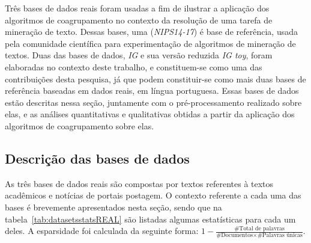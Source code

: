 \documentclass[
    12pt,                %
    oneside,            %
    a4paper,            %
    english,            %
    brazil                %
    ]{abntex2ppgsi}
\begin{document}
Três bases de dados reais foram usadas a fim de ilustrar a aplicação dos algoritmos de coagrupamento no contexto da resolução de uma tarefa de mineração de texto.
Dessas bases, uma (\textit{NIPS14-17}) é base de referência, usada pela comunidade científica para experimentação de algoritmos de mineração de textos.
Duas das bases de dados, \textit{IG} e sua versão reduzida \textit{IG toy}, foram elaboradas no contexto deste trabalho, e constituem-se como uma das contribuições desta pesquisa, já que podem constituir-se como mais duas bases de referência baseadas em dados reais, em língua portuguesa.
Essas bases de dados estão descritas nessa seção, juntamente com o pré-processamento realizado sobre elas, e as análises quantitativas e qualitativas obtidas a partir da aplicação dos algoritmos de coagrupamento sobre elas.

\subsection{Descrição das bases de dados}

As três bases de dados reais são compostas por textos referentes à textos acadêmicos e notícias de portais postagem.
O contexto referente a cada uma das bases é brevemente apresentados nesta seção, sendo que na tabela~\ref{tab:datasetsstatsREAL} são listadas algumas estatísticas para cada um deles.
A esparsidade foi calculada da seguinte forma: $1 - \frac{ \text{\# Total de palavras} }{ \text{\# Documentos} \times \text{\# Palavras únicas} }$.
\end{document}
